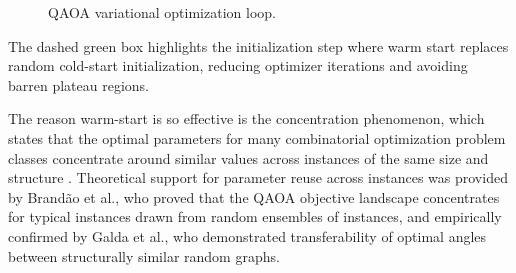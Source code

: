 \documentclass[a4paper]{report}
\begin{document}
{\begin{itemize}
\begin{itemize}
\begin{figure}[h]
\caption{QAOA variational optimization loop.}
\label{fig:qaoa-loop}
\end{figure}

The dashed green box highlights the initialization step where warm start replaces random cold-start initialization, reducing optimizer iterations and avoiding barren plateau regions.

The reason warm-start is so effective is the concentration phenomenon, which states that the optimal parameters for many combinatorial optimization problem classes concentrate around similar values across instances of the same size and structure \cite{warm-start}. Theoretical support for parameter reuse across instances was provided by Brandão et al., who proved that the QAOA objective landscape concentrates for typical instances drawn from random ensembles of instances\cite{fixedcontrolparametersquantum}, and empirically confirmed by Galda et al., who demonstrated transferability of optimal angles between structurally similar random graphs\cite{angletransfer}. 


\end{itemize}
\end{itemize}}
\end{document}
